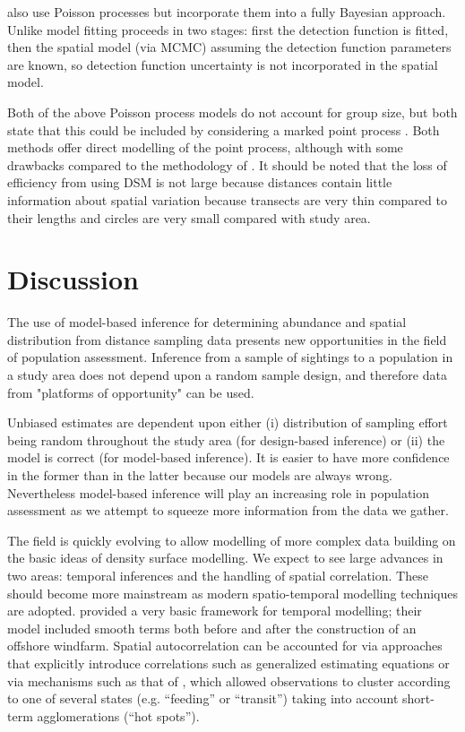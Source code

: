 \documentclass[a4paper,12pt]{article}
\begin{document}
\cite{Niemi:2010kx} also use Poisson processes but incorporate them into a fully Bayesian approach. Unlike \cite{Johnson:2010gf} model fitting proceeds in two stages: first the detection function is fitted, then the spatial model (via MCMC) assuming the detection function parameters are known, so detection function uncertainty is not incorporated in the spatial model.

Both of the above Poisson process models do not account for group size, but both state that this could be included by considering a marked point process \citep[Section 5.5]{cox1980point}. Both methods offer direct modelling of the point process, although with some drawbacks compared to the methodology of \cite{Hedley:2004et}. It should be noted that the loss of efficiency from using DSM is not large \citep[p. 313]{Buckland:2004ts} because distances contain little information about spatial variation because transects are very thin compared to their lengths and circles are very small compared with study area.


\section*{Discussion}
\label{s:discussion}

The use of model-based inference for determining abundance and spatial distribution from distance sampling data presents new opportunities in the field of population assessment.   Inference from a sample of sightings to a population in a study area does not depend upon a random sample design, and therefore data from "platforms of opportunity" \citep{Williams:2006tz} can be used.

Unbiased estimates are dependent upon either (i) distribution of sampling effort being random throughout the study area (for design-based inference) or (ii) the model is correct (for model-based inference).  It is easier to have more confidence in the former than in the latter because our models are always wrong. Nevertheless model-based inference will play an increasing role in population assessment as we attempt to squeeze more information from the data we gather.

The field is quickly evolving to allow modelling of more complex data building on the basic ideas of density surface modelling. We expect to see large advances in two areas: temporal inferences and the handling of spatial correlation. These should become more mainstream as modern spatio-temporal modelling techniques are adopted. \cite{Petersen:2011vy} provided a very basic framework for temporal modelling; their model included smooth terms both before and after the construction of an offshore windfarm. Spatial autocorrelation can be accounted for via approaches that explicitly introduce correlations such as generalized estimating equations \cite[GEEs;][]{Hardin:2003uf} or via mechanisms such as that of \cite{Skaug:2006gs}, which allowed observations to cluster according to one of several states (e.g. ``feeding'' or ``transit'') taking into account short-term agglomerations (``hot spots'').
\end{document}
